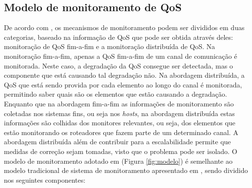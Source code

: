 \subsection{Modelo de monitoramento de QoS} %

	De acordo com \cite{JTK00}, os mecanismos de monitoramento podem ser divididos em duas categorias, baseado na informação de QoS que pode ser obtida através deles: monitoração de QoS fim-a-fim e a monitoração distribuída de QoS. Na monitoração fim-a-fim, apenas a QoS fim-a-fim de um canal de comunicação é monitorada. Neste caso, a degradação da QoS consegue ser detectada, mas o componente que está causando tal degradação não. Na abordagem distribuída, a QoS que está sendo provida por cada elemento ao longo do canal é monitorada, permitindo saber quais são os elementos que estão causando a degradação. Enquanto que na abordagem fim-a-fim as informações de monitoramento são coletadas nos sistemas fins, ou seja nos \textit{hosts}, na abordagem distribuída estas informações são colhidas dos monitores relevantes, ou seja, dos elementos que estão monitorando os roteadores que fazem parte de um determinado canal. A abordagem distribuída além de contribuir para a escalabilidade permite que medidas de correção sejam tomadas, visto que o problema pode ser isolado. O modelo de monitoramento adotado em \cite{JTK00} (Figura \ref{fig:modelo}) é semelhante ao modelo tradicional de sistema de monitoramento apresentado em \cite{STALL96}, sendo dividido nos seguintes componentes:

